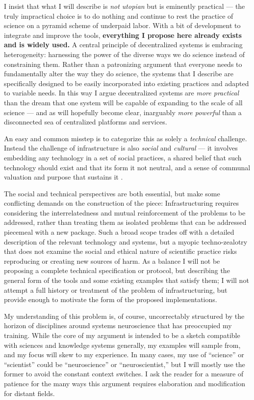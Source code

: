 \documentclass[10pt]{tufte-book}
\begin{document}
I insist that what I will describe is \emph{not utopian} but is
eminently practical --- the truly impractical choice is to do nothing
and continue to rest the practice of science on a pyramid scheme \citep{ponziSciencePyramidScheme2020}  of underpaid labor. With a bit
of development to integrate and improve the tools, \textbf{everything I
propose here already exists and is widely used.} A central principle of
decentralized systems is embracing heterogeneity: harnessing the power
of the diverse ways we do science instead of constraining them. Rather
than a patronizing argument that everyone needs to fundamentally alter
the way they do science, the systems that I describe are specifically
designed to be easily incorporated into existing practices and adapted
to variable needs. In this way I argue decentralized systems are
\emph{more practical} than the dream that one system will be capable of
expanding to the scale of all science --- and as will hopefully become
clear, inarguably \emph{more powerful} than a disconnected sea of
centralized platforms and services.

An easy and common misstep is to categorize this as solely a
\emph{technical} challenge. Instead the challenge of infrastructure is
also \emph{social} and \emph{cultural} --- it involves embedding any
technology in a set of social practices, a shared belief that such
technology should exist and that its form it not neutral, and a sense of
communal valuation and purpose that sustains it \citep{bietzSustainingDevelopmentCyberinfrastructure2012} .

The social and technical perspectives are both essential, but make some
conflicting demands on the construction of the piece: Infrastructuring
requires considering the interrelatedness and mutual reinforcement of
the problems to be addressed, rather than treating them as isolated
problems that can be addressed piecemeal with a new package. Such a
broad scope trades off with a detailed description of the relevant
technology and systems, but a myopic techno-zealotry that does not
examine the social and ethical nature of scientific practice risks
reproducing or creating new sources of harm. As a balance I will not be
proposing a complete technical specification or protocol, but describing
the general form of the tools and some existing examples that satisfy
them; I will not attempt a full history or treatment of the problem of
infrastructuring, but provide enough to motivate the form of the
proposed implementations.

My understanding of this problem is, of course, uncorrectably structured
by the horizon of disciplines around systems neuroscience that has
preoccupied my training. While the core of my argument is intended to be
a sketch compatible with sciences and knowledge systems generally, my
examples will sample from, and my focus will skew to my experience. In
many cases, my use of ``science'' or ``scientist'' could be
``neuroscience'' or ``neuroscientist,'' but I will mostly use the former
to avoid the constant context switches. I ask the reader for a measure
of patience for the many ways this argument requires elaboration and
modification for distant fields. 
\end{document}
